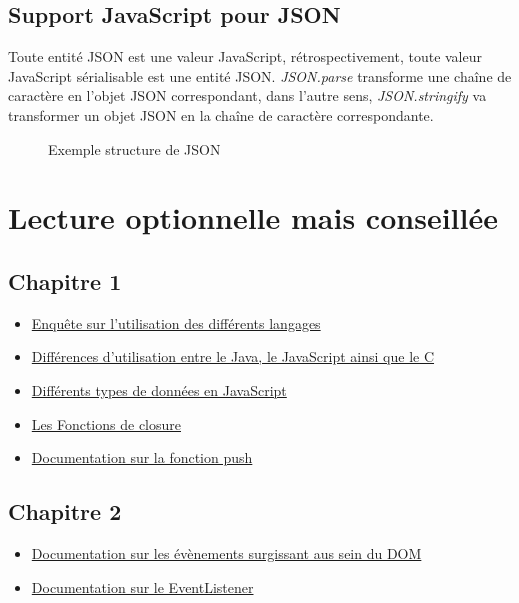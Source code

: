 \documentclass{article}[12pt]
\begin{document}
\subsection{Support JavaScript pour JSON}
Toute entité JSON est une valeur JavaScript, rétrospectivement, toute valeur JavaScript sérialisable est une entité JSON. \emph{JSON.parse} transforme une chaîne de caractère en l'objet JSON correspondant, dans l'autre sens, \emph{JSON.stringify} va transformer un objet JSON en la chaîne de caractère correspondante.
\begin{figure}[H]
	\centering
    \caption{Exemple structure de JSON}
\end{figure}
\section{Lecture optionnelle mais conseillée}
\subsection{Chapitre 1}
\begin{itemize}
	\item \href{http://stackoverflow.com/research/developer-survey-2016}{Enquête sur l'utilisation des différents langages}
    \item \href{http://www.stefankrause.net/wp/?p=144}{Différences d'utilisation entre le Java, le JavaScript ainsi que le C}
    \item \href{http://www.w3schools.com/js/js_datatypes.asp}{Différents types de données en JavaScript}
    \item \href{http://www.w3schools.com/js/js_function_closures.asp}{Les Fonctions de closure}
	\item \href{http://www.w3schools.com/jsref/jsref_push.asp}{Documentation sur la fonction push}
\end{itemize}
\subsection{Chapitre 2}
\begin{itemize}
    \item \href{http://www.w3schools.com/jsref/dom_obj_event.asp}{Documentation sur les évènements surgissant aus sein du DOM}
    \item \href{http://www.w3schools.com/js/js_htmldom_eventlistener.asp}{Documentation sur le EventListener}
\end{itemize}
\end{document}
